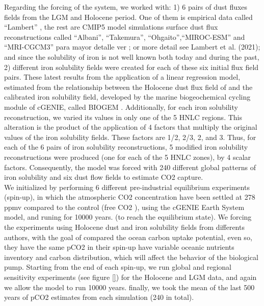 Regarding the forcing of the system, we worked with: 1) 6 pairs of dust fluxes fields from the LGM and Holocene period. One of them is empirical data called ``Lambert'' \citep{lambert2015dust}, the rest are CMIP5 model simulations surface dust flux reconstructions called ``Albani'', ``Takemura'', ``Ohgaito'',``MIROC-ESM'' and ``MRI-CGCM3'' \citep{albani2014improved,takemura2009simulation,ohgaito2018effect,sueyoshi2013set,yukimoto2012new} para mayor detalle ver \cite{lambert2021regional}; or more detail see Lambert et al. (2021); and since the solubility of iron is not well known both today and during the past, 2) different iron solubility fields were created for each of these six initial flux field pairs. These latest results from the application of a linear regression model, estimated from the relationship between the Holocene dust flux field of \cite{mahowald2006change} and the calibrated iron solubility field, developed by the marine biogeochemical cycling module of cGENIE, called BIOGEM  \citep{ridgwell2007marine}. Additionally, for each iron solubility reconstruction, we varied its values in only one of the 5 HNLC regions. This alteration is the product of the application of 4 factors that multiply the original values of the iron solubility fields. These factors are 1/2, 2/3, 2, and 3. Thus, for each of the 6 pairs of iron solubility reconstructions, 5 modified iron solubility reconstructions were produced (one for each of the 5 HNLC zones), by 4 scalar factors. Consequently, the model was forced with 240 different global patterns of iron solubility and six dust flow fields to estimate CO2 capture.\\

We initialized by performing 6 different pre-industrial equilibrium experiments (spin-up), in which the atmospheric CO2 concentration have been settled at 278 ppmv compared to the control (free CO2 ), using the cGENIE Earth System model, and runing for 10000 years. (to reach the equilibrium state). We forcing the experiments using Holocene dust and iron solubility fields from differents authors, with the goal of compared the ocean carbon uptake potential, even so, they have the same pCO2 in their spin-up have variable oceanic nutrients inventory and carbon distribution, which will affect the behavior of the biological pump. Starting from the end of each spin-up, we run global and regional sensitivity experiments (see figure \ref{})  for the Holocene and LGM data, and again we allow the model to run 10000 years. finally, we took the mean of the last 500 years of pCO2 estimates from each simulation (240 in total). \\

